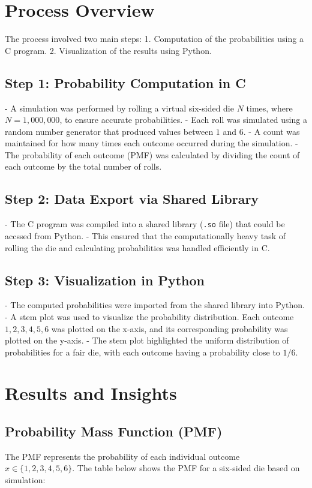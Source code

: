 \documentclass[journal]{IEEEtran}
\begin{document}
\section*{Process Overview}
The process involved two main steps: 
1. Computation of the probabilities using a C program.
2. Visualization of the results using Python.

\subsection*{Step 1: Probability Computation in C}
- A simulation was performed by rolling a virtual six-sided die \(N\) times, where \(N = 1,000,000\), to ensure accurate probabilities.
- Each roll was simulated using a random number generator that produced values between \(1\) and \(6\).
- A count was maintained for how many times each outcome occurred during the simulation.
- The probability of each outcome (PMF) was calculated by dividing the count of each outcome by the total number of rolls.

\subsection*{Step 2: Data Export via Shared Library}
- The C program was compiled into a shared library (\texttt{.so} file) that could be accssed from Python.
- This ensured that the computationally heavy task of rolling the die and calculating probabilities was handled efficiently in C.

\subsection*{Step 3: Visualization in Python}
- The computed probabilities were imported from the shared library into Python.
- A stem plot was used to visualize the probability distribution. Each outcome \(1, 2, 3, 4, 5, 6\) was plotted on the x-axis, and its corresponding probability was plotted on the y-axis.
- The stem plot highlighted the uniform distribution of probabilities for a fair die, with each outcome having a probability close to \(1/6\).

\section*{Results and Insights}
\subsection*{Probability Mass Function (PMF)}
The PMF represents the probability of each individual outcome \(x \in \{1, 2, 3, 4, 5, 6\}\). The table below shows the PMF for a six-sided die based on simulation:
\end{document}
